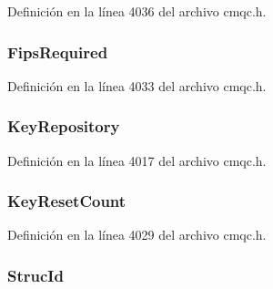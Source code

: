 Definición en la línea 4036 del archivo cmqc.\+h.

\hypertarget{structtag_m_q_s_c_o_af3cd714ea40e052132d11b981918d067}{}
\subsubsection[{Fips\+Required}]{ Fips\+Required}\label{structtag_m_q_s_c_o_af3cd714ea40e052132d11b981918d067}


Definición en la línea 4033 del archivo cmqc.\+h.

\hypertarget{structtag_m_q_s_c_o_a7efe10d0683c0ef04c475b7f498861e7}{}
\subsubsection[{Key\+Repository}]{ Key\+Repository}\label{structtag_m_q_s_c_o_a7efe10d0683c0ef04c475b7f498861e7}


Definición en la línea 4017 del archivo cmqc.\+h.

\hypertarget{structtag_m_q_s_c_o_a085f44eefd3c01bef61fabf7094d8d53}{}
\subsubsection[{Key\+Reset\+Count}]{ Key\+Reset\+Count}\label{structtag_m_q_s_c_o_a085f44eefd3c01bef61fabf7094d8d53}


Definición en la línea 4029 del archivo cmqc.\+h.

\hypertarget{structtag_m_q_s_c_o_a0530922ca944569b52601d74941f96e4}{}
\subsubsection[{Struc\+Id}]{ Struc\+Id}\label{structtag_m_q_s_c_o_a0530922ca944569b52601d74941f96e4}


